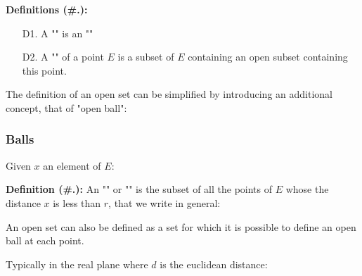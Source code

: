 	\textbf{Definitions (\#\thesection.\mydef):} 
	\begin{enumerate}
		\item[D1.] A "" is an ""

		\item[D2.] A "" of a point $E$ is a subset of $E$ containing an open subset containing this point.
	\end{enumerate}
	The definition of an open set can be simplified by introducing an additional concept, that of "open ball":
	
	\subsubsection{Balls}
	Given $x$ an element of $E$:
	
	\textbf{Definition (\#\thesection.\mydef):} An "" or "" is the subset of all the points of $E$ whose the distance $x$ is less than $r$, that we write in general:
	
	An open set can also be defined as a set for which it is possible to define an open ball at each point.
	
	Typically in the real plane where $d$ is the euclidean distance:
	
